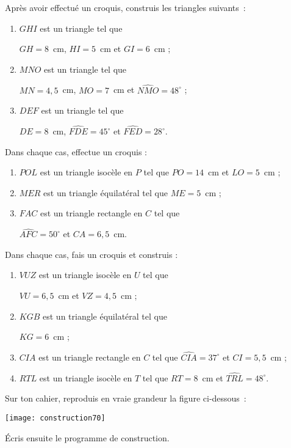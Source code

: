 \begin{exercice}
Après avoir effectué un croquis, construis les triangles suivants :
 \begin{enumerate}
  \item $GHI$ est un triangle tel que 
  
  $GH = 8$ cm, $HI = 5$ cm et $GI = 6$ cm ;
  \item $MNO$ est un triangle tel que 
  
  $MN = 4,5$ cm, $MO = 7$ cm et $\widehat{NMO} = 48^\circ$ ;
  \item $DEF$ est un triangle tel que 
  
  $DE = 8$ cm, $\widehat{FDE} = 45^\circ$ et $\widehat{FED} = 28^\circ$. 
  \end{enumerate}
\end{exercice}


\begin{exercice}
Dans chaque cas, effectue un croquis :
 \begin{enumerate}
  \item $POL$ est un triangle isocèle en $P$ tel que $PO = 14$ cm et $LO = 5$ cm ;
  \item $MER$ est un triangle équilatéral tel que $ME = 5$ cm ;
  \item $FAC$ est un triangle rectangle en $C$ tel que 
  
  $\widehat{AFC}= 50^\circ$ et $CA = 6,5$ cm.  
  \end{enumerate}
\end{exercice}


\begin{exercice}
Dans chaque cas, fais un croquis et construis :
 \begin{enumerate}
  \item $VUZ$ est un triangle isocèle en $U$ tel que 
  
  $VU = 6,5$ cm et $VZ = 4,5$ cm ;
  \item $KGB$ est un triangle équilatéral tel que 
  
  $KG = 6$ cm ;
  \item $CIA$ est un triangle rectangle en $C$ tel que $\widehat{CIA} = 37^\circ$ et $CI = 5,5$ cm ;
  \item $RTL$ est un triangle isocèle en $T$ tel que $RT = 8$ cm et $\widehat{TRL} = 48^\circ$.
  \end{enumerate}
\end{exercice}


\begin{exercice}
Sur ton cahier, reproduis en vraie grandeur la figure ci-dessous :
\begin{center} \texttt{[image: construction70]} \end{center}
Écris ensuite le programme de construction.
\end{exercice}


